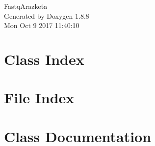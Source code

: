 \documentclass[twoside]{book}
\newcommand{\+}{\discretionary{\mbox{\scriptsize$\hookleftarrow$}}{}{}}
\newcommand{\clearemptydoublepage}{%
  \newpage{\pagestyle{empty}\cleardoublepage}%
}
\begin{document}
\hypersetup{pageanchor=false,
             bookmarks=true,
             bookmarksnumbered=true,
             pdfencoding=unicode
            }
\begin{titlepage}
\vspace*{7cm}
\begin{center}%
{\Large Fastq\+Arazketa }\\
\vspace*{1cm}
{\large Generated by Doxygen 1.8.8}\\
\vspace*{0.5cm}
{\small Mon Oct 9 2017 11:40:10}\\
\end{center}
\end{titlepage}
\clearemptydoublepage
\tableofcontents
\clearemptydoublepage
{}
\hypersetup{pageanchor=true}

\chapter{Class Index}

\chapter{File Index}

\chapter{Class Documentation}




















\end{document}
